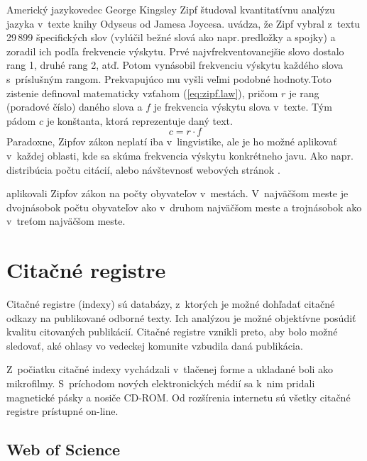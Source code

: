 Americký jazykovedec George Kingsley Zipf študoval kvantitatívnu analýzu jazyka
v~texte knihy Odyseus od Jamesa Joycesa. \citet{Powers1998} uvádza, že Zipf
vybral z~textu 29\,899 špecifických slov (vylúčil bežné slová ako
napr.\,predložky a spojky) a zoradil ich podľa frekvencie výskytu.  Prvé
najvfrekventovanejšie slovo dostalo rang 1, druhé rang 2, atď.  Potom vynásobil
frekvenciu výskytu každého slova s~príslušným rangom.  Prekvapujúco mu vyšli
veľmi podobné hodnoty.Toto zistenie definoval matematicky vzťahom (\ref{eq:zipf.law}),
pričom $r$ je rang (poradové číslo) daného slova a $f$ je frekvencia výskytu
slova v~texte.  Tým pádom $c$ je konštanta, ktorá reprezentuje daný text.
\begin{equation}
\label{eq:zipf.law}
c = r \cdot f
\end{equation}
Paradoxne, Zipfov zákon neplatí iba v~lingvistike, ale je ho možné aplikovať
v~každej oblasti, kde sa skúma frekvencia výskytu konkrétneho javu.  Ako
napr.\,distribúcia počtu citácií, alebo návštevnosť webových stránok \citep{Li2002}.

\citet{Jiang2014} aplikovali Zipfov zákon na počty obyvateľov v~mestách.  V~najväčšom
meste je dvojnásobok počtu obyvateľov ako v~druhom najväčšom meste a trojnásobok
ako v~treťom najväčšom meste.



\section{Citačné registre}

Citačné registre (indexy) sú databázy, z~ktorých je možné dohľadať citačné
odkazy na publikované odborné texty.  Ich analýzou je možné objektívne posúdiť
kvalitu citovaných publikácií.  Citačné registre vznikli preto, aby bolo možné
sledovať, aké ohlasy vo vedeckej komunite vzbudila daná publikácia.

Z~počiatku citačné indexy vychádzali v~tlačenej forme a ukladané boli ako
mikrofilmy.  S~príchodom nových elektronických médií sa k~nim pridali magnetické
pásky a nosiče CD-ROM.  Od rozšírenia internetu sú všetky citačné registre
prístupné on-line.


\subsection{Web of Science}
\label{sec:wos}


